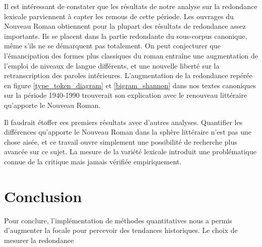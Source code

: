 \documentclass[a4paper,twoside,12pt]{book}
\begin{document}
Il est intéressant de constater que les résultats de notre analyse sur la redondance lexicale parviennent à capter les remous de cette période. Les ouvrages du Nouveau Roman obtiennent pour la plupart des résultats de redondance assez importants. Ils se placent dans la partie redondante du sous-corpus canonique, même s'ils ne se démarquent pas totalement. On peut conjecturer que l'émancipation des formes plus classiques du roman entraîne une augmentation de l'emploi de niveaux de langue différents, et une nouvelle liberté sur la retranscription des paroles intérieures. L'augmentation de la redondance repérée en figure \ref{type_token_diagram} et \ref{bigram_shannon} dans nos textes canoniques sur la période 1940-1990 trouverait son explication avec le renouveau littéraire qu'apporte le Nouveau Roman. 

Il faudrait étoffer ces premiers résultats avec d'autres analyses. Quantifier les différences qu'apporte le Nouveau Roman dans la sphère littéraire n'est pas une chose aisée, et ce travail ouvre simplement une possibilité de recherche plus avancée sur ce sujet. La mesure de la variété lexicale introduit une problématique connue de la critique mais jamais vérifiée empiriquement. 

\newpage

\section*{Conclusion}
Pour conclure, l'implémentation de méthodes quantitatives nous a permis d'augmenter la focale pour percevoir des tendances historiques. Le choix de mesurer la redondance 
\end{document}
